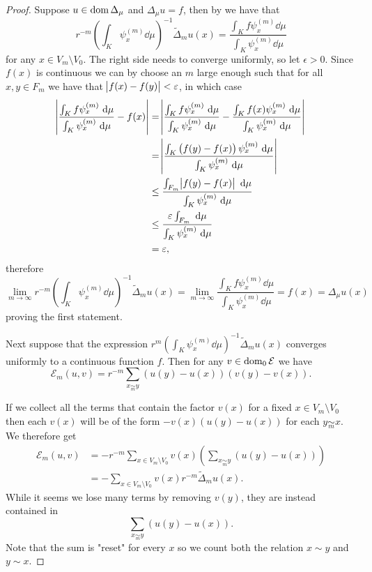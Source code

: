 \begin{proof}
	Suppose $u \in \operatorname{dom} \Delta_{\mu}$ and $\Delta_{\mu} u=f$, then by  we have that 
	\begin{equation}
		r^{-m} \left(\int_{K} \psi^{(m)}_{x} \dd\mu \right)^{-1} \widetilde{\Delta}_m u(x) = \frac{\int_{K} f \psi_x^{(m)} \dd\mu}{\int_{K} \psi_x^{(m)} \dd\mu}
	\end{equation}
	for any $x \in V_m \setminus V_0$. The right side needs to converge uniformly, so let $\epsilon > 0$. Since $f(x)$ is continuous we can by  choose an $m$ large enough such that for all $x, y \in F_m$ we have that $\abs{f(x) - f(y)} < \varepsilon$, in which case
	\begin{align}
		\abs{\frac{\int_{K} f \psi_x^{(m)} \ \text{d}\mu}{\int_{K} \psi_x^{(m)} \ \text{d}\mu} - f(x)} &= \abs{\frac{\int_{K} f \psi_x^{(m)} \ \text{d}\mu}{\int_{K} \psi_x^{(m)} \ \text{d}\mu} - \frac{\int_{K} f(x) \psi_x^{(m)} \ \text{d}\mu}{\int_{K} \psi_x^{(m)} \ \text{d}\mu}} \\
		&= \abs{\frac{\int_{K} \left(f(y) -f(x) \right) \psi_x^{(m)} \ \text{d}\mu}{\int_{K} \psi_x^{(m)} \ \text{d}\mu}} \\
		&\leq \frac{\int_{F_m} \abs{f(y) -f(x)} \ \text{d}\mu}{\int_{K} \psi_x^{(m)} \ \text{d}\mu} \\
		&\leq \frac{\varepsilon \int_{F_m} \ \text{d}\mu}{\int_{K} \psi_x^{(m)} \ \text{d}\mu} \\
		&= \varepsilon,
	\end{align}
	therefore
	\begin{equation}
		\lim_{m \to \infty} r^{-m} \left(\int_{K} \psi^{(m)}_{x} \dd\mu \right)^{-1} \widetilde{\Delta}_m u(x) = \lim_{m \to \infty} \frac{\int_{K} f \psi_x^{(m)} \dd \mu}{\int_{K} \psi_x^{(m)} \dd \mu} = f(x) = \Delta_{\mu} u(x)
	\end{equation}
	proving the first statement.
	
	Next suppose that the expression $r^{m} \left(\int_{K} \psi_x^{(m)} \dd \mu \right)^{-1} \widetilde{\Delta}_m u(x)$ converges uniformly to a continuous function $f$. Then for any $v \in \operatorname{dom}_0 \mathcal{E}$ we have 
	\begin{equation}
		\mathcal{E}_m(u,v) = r^{-m} \sum_{x \underset{m}{\sim} y} \left( u(y) - u(x) \right)\left(v(y) - v(x) \right).
	\end{equation}
	
	If we collect all the terms that contain the factor $v(x)$ for a fixed $x \in V_m \setminus V_0$ then each $v(x)$ will be of the form $-v(x) \left(u(y) - u(x) \right)$ for each $y \underset{m}{\sim} x$. We therefore get
	\begin{align}
		\mathcal{E}_m(u,v) &= - r^{-m}  \sum_{x \in V_m \setminus V_0} v(x) \left( \sum_{x \underset{m}{\sim} y} \left( u(y) - u(x) \right) \right) \\
		&= -\sum_{x \in V_m \setminus V_0} v(x) r^{-m} \widetilde{\Delta}_{m}u(x).
	\end{align}
	While it seems we lose many terms by removing $v(y)$, they are instead contained in 
	$$\sum_{x \underset{m}{\sim} y} \left( u(y) - u(x) \right).$$ 
	Note that the sum is "reset" for every $x$ so we count both the relation $x \sim y$ and $y \sim x$.
	

\end{proof}
